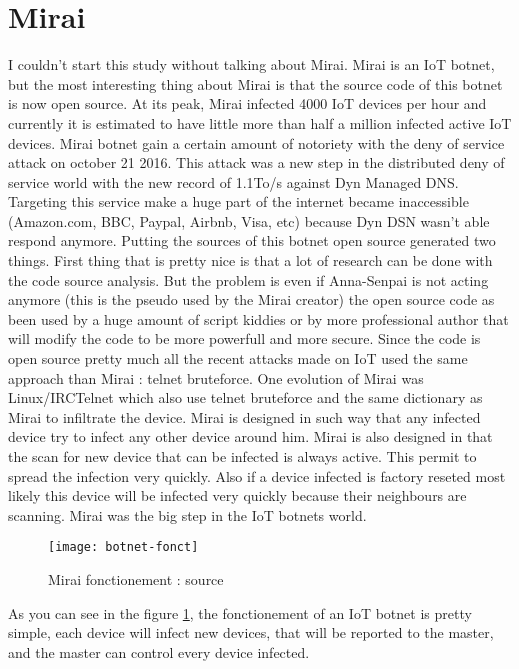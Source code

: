 \documentclass{report}
\begin{document}
\section{Mirai}
I couldn't start this study without talking about Mirai. Mirai is an IoT botnet, but the most interesting thing about Mirai is that the source code of this botnet is now open source. At its peak, Mirai infected 4000 IoT devices
per hour and currently it is estimated to have little more than half a million infected active IoT devices\autocite{angrishi2017turning}. Mirai botnet gain a certain amount of notoriety with the deny of service attack on october 21 2016. This attack was a new step in the distributed deny of service world with the new record of 1.1To/s against Dyn Managed DNS. Targeting this service make a huge part of the internet became inaccessible (Amazon.com, BBC, Paypal, Airbnb, Visa, etc) because Dyn DSN wasn't able respond anymore.\newline
Putting the sources of this botnet open source generated two things. First thing that is pretty nice is that a lot of research can be done with the code source analysis. But the problem is even if Anna-Senpai is not acting anymore (this is the pseudo used by the Mirai creator) the open source code as been used by a huge amount of script kiddies or by more professional author that will modify the code to be more powerfull and more secure. Since the code is open source pretty much all the recent attacks made on IoT used the same approach than Mirai : telnet bruteforce.
One evolution of Mirai was Linux/IRCTelnet which also use telnet bruteforce and the same dictionary as Mirai to infiltrate the device.\newline
\newline
Mirai is designed in such way that any infected device try to infect any other device around him. Mirai is also designed in that the scan for new device that can be infected is always active. This permit to spread the infection very quickly. Also if a device infected is factory reseted most likely this device will be infected very quickly because their neighbours are scanning. Mirai was the big step in the IoT botnets world.\newline
\newline
\begin{figure}[h]
 \caption{Mirai fonctionement : source\autocite{kolias2017ddos}}
 \centering
 \texttt{[image: botnet-fonct]}
 \label{fig:botnet-fonct}
\end{figure}
As you can see in the figure \ref{fig:botnet-fonct}, the fonctionement of an IoT botnet is pretty simple, each device will infect new devices, that will be reported to the master, and the master can control every device infected.
\end{document}
